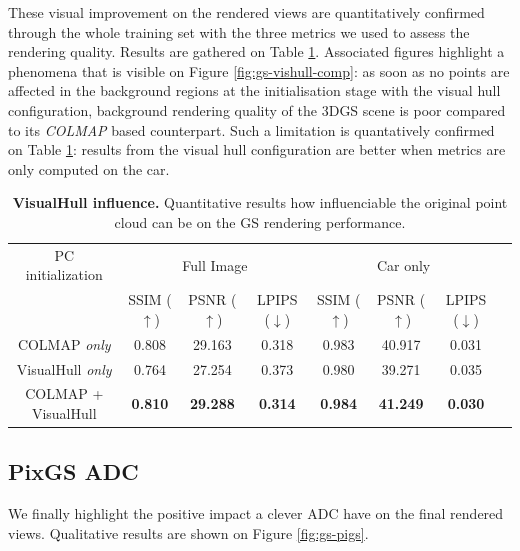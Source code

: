 These visual improvement on the rendered views are quantitatively confirmed through the whole training set with the three metrics we used to assess the rendering quality. Results are gathered on Table \ref{table:gs-vh-influence}. Associated figures highlight a phenomena that is visible on Figure \ref{fig:gs-vishull-comp}: as soon as no points are affected in the background regions at the initialisation stage with the visual hull configuration, background rendering quality of the 3D\ac{GS} scene is poor compared to its  \textit{COLMAP} based counterpart. Such a limitation is quantatively confirmed on Table \ref{table:gs-vh-influence}: results from the visual hull configuration are better when metrics are only computed on the car. 
\begin{table}[htp!]
  \caption{\textbf{VisualHull influence.} Quantitative results how influenciable the original point cloud can be on the GS rendering performance.}
  \label{table:gs-vh-influence}
  \begin{adjustbox}{width=\linewidth}
  \begin{tabular}[h]{c||ccccccc}
  \hline
   PC initialization & \multicolumn{3}{c}{Full Image} & \multicolumn{3}{c}{Car only} \\
   &  SSIM ($\uparrow$) & PSNR ($\uparrow$) & LPIPS ($\downarrow$) & SSIM ($\uparrow$) & PSNR ($\uparrow$) & LPIPS ($\downarrow$)\\
  \hline
  COLMAP \textit{only} & 0.808 & 29.163 & 0.318 & 0.983 & 40.917 & 0.031\\
  VisualHull \textit{only} & 0.764 & 27.254 & 0.373 & 0.980 &   39.271 & 0.035 \\
  COLMAP + VisualHull & \textbf{0.810} & \textbf{29.288} & \textbf{0.314}  & \textbf{0.984} & \textbf{41.249}   & \textbf{0.030} \\
  \hline 
  \end{tabular}
  \end{adjustbox}
  \end{table}

\subsection{PixGS ADC} 

We finally highlight the positive impact a clever \ac{ADC} have on the final rendered views. Qualitative results are shown on Figure \ref{fig:gs-pigs}. 

